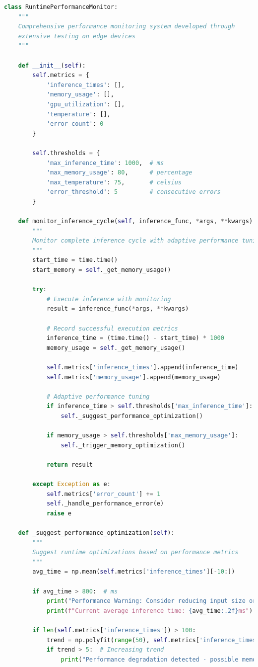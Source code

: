 \documentclass[12pt,a4paper]{report}
\begin{document}
\begin{lstlisting}[caption=Runtime Performance Monitoring System, label=lst:performance_monitoring, language=python]
class RuntimePerformanceMonitor:
    """
    Comprehensive performance monitoring system developed through
    extensive testing on edge devices
    """
    
    def __init__(self):
        self.metrics = {
            'inference_times': [],
            'memory_usage': [],
            'gpu_utilization': [],
            'temperature': [],
            'error_count': 0
        }
        
        self.thresholds = {
            'max_inference_time': 1000,  # ms
            'max_memory_usage': 80,      # percentage
            'max_temperature': 75,       # celsius
            'error_threshold': 5         # consecutive errors
        }
    
    def monitor_inference_cycle(self, inference_func, *args, **kwargs):
        """
        Monitor complete inference cycle with adaptive performance tuning
        """
        start_time = time.time()
        start_memory = self._get_memory_usage()
        
        try:
            # Execute inference with monitoring
            result = inference_func(*args, **kwargs)
            
            # Record successful execution metrics
            inference_time = (time.time() - start_time) * 1000
            memory_usage = self._get_memory_usage()
            
            self.metrics['inference_times'].append(inference_time)
            self.metrics['memory_usage'].append(memory_usage)
            
            # Adaptive performance tuning
            if inference_time > self.thresholds['max_inference_time']:
                self._suggest_performance_optimization()
            
            if memory_usage > self.thresholds['max_memory_usage']:
                self._trigger_memory_optimization()
            
            return result
            
        except Exception as e:
            self.metrics['error_count'] += 1
            self._handle_performance_error(e)
            raise e
    
    def _suggest_performance_optimization(self):
        """
        Suggest runtime optimizations based on performance metrics
        """
        avg_time = np.mean(self.metrics['inference_times'][-10:])
        
        if avg_time > 800:  # ms
            print("Performance Warning: Consider reducing input size or batch size")
            print(f"Current average inference time: {avg_time:.2f}ms")
            
        if len(self.metrics['inference_times']) > 100:
            trend = np.polyfit(range(50), self.metrics['inference_times'][-50:], 1)[0]
            if trend > 5:  # Increasing trend
                print("Performance degradation detected - possible memory leak")
\end{lstlisting}
\end{document}
